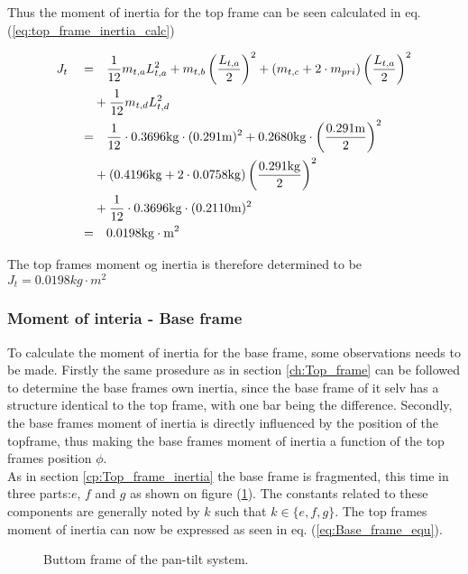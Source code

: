 \documentclass[../../main]{subfiles}
\begin{document}
Thus the moment of inertia for the top frame can be seen calculated in eq. (\ref{eq:top_frame_inertia_calc})

\begin{equation}
  \centering
    \label{eq:top_frame_inertia_calc}
  \begin{split}
      J_t  \quad  =&  \quad \frac{1}{12} m_{t,a}L_{t,a}^2 + m_{t,b}\left(\frac{L_{t,a}}{2}\right)^2 + (m_{t,c} + 2\cdot m_{pri})\left(\frac{L_{t,a}}{2}\right)^2 \\
      &+ \frac{1}{12}m_{t,d}L_{t,d}^2 \\
      =& \quad  \frac{1}{12} \cdot 0.3696 \si{kg}  \cdot (0.291 \si{m})^2 + 0.2680 \si{kg} \cdot \left(\frac{0.291 \si{m}}{2}\right)^2 \\
      &+ (0.4196 \si{kg} + 2\cdot 0.0758 \si{kg})\left(\frac{0.291\si{kg}}{2}\right)^2 \\
      &+ \frac{1}{12} \cdot 0.3696\si{kg} \cdot (0.2110\si{m})^2 \\
      =& \quad 0.0198 \si{kg\cdot m^2}
  \end{split}
\end{equation}

The top frames moment og inertia is therefore determined to be
\newline $J_{t} = 0.0198 \si{kg\cdot m^2}$

\subsubsection{Moment of interia - Base frame}

To calculate the moment of inertia for the base frame, some observations needs to be made. Firstly the same prosedure as in section \ref{ch:Top_frame} can be followed to determine the base frames own inertia, since the base frame of it selv has a structure identical to the top frame, with one bar being the difference. Secondly, the base frames moment of inertia is directly influenced by the position of the topframe, thus making the base frames moment of inertia a function of the top frames position $\phi$.\\
As in section \ref{cp:Top_frame_inertia} the base frame is fragmented, this time in three parts:$e$, $f$ and $g$ as shown on figure (\ref{fig:ButtomFrame}). The constants related to these components are generally noted by $k$ such that $k \in \{e,f,g\}$. The top frames moment of inertia can now be expressed as seen in eq. (\ref{eq:Base_frame_equ}).

\begin{figure}[h]
  \label{fig:ButtomFrame}
  \centering
  
  \caption{Buttom frame of the pan-tilt system.}
\end{figure}
\end{document}

